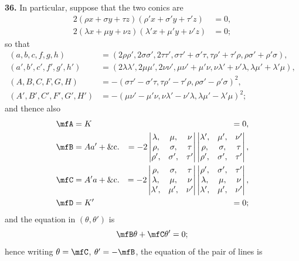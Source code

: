 \documentclass[11pt,a4paper]{book}
\begin{document}
\textbf{36.} In particular, suppose that the two conics are
\begin{align*}
2(\rho x + \sigma y + \tau z)(\rho' x + \sigma' y + \tau' z) &= 0,\\
2(\lambda x + \mu y + \nu z)(\lambda' x + \mu' y + \nu' z) &= 0;
\end{align*}
so that
\begin{align*}
(a, b, c, f, g, h) &= (2\rho\rho', 2\sigma\sigma', 2\tau\tau', \sigma\tau' + \sigma'\tau, \tau\rho' + \tau'\rho, \rho\sigma' + \rho'\sigma),\\
(a', b', c', f', g', h') &= (2\lambda\lambda', 2\mu\mu', 2\nu\nu', \mu\nu' + \mu'\nu, \nu\lambda' + \nu'\lambda, \lambda\mu' + \lambda'\mu),\\
(A, B, C, F, G, H) &= -(\sigma\tau' - \sigma'\tau, \tau\rho' - \tau'\rho, \rho\sigma' - \rho'\sigma)^{2},\\
(A', B', C', F', G', H') &= -(\mu\nu' - \mu'\nu, \nu\lambda' - \nu'\lambda, \lambda\mu' - \lambda'\mu)^{2};
\end{align*}
and thence also
\begin{align*}
\mfA &= K &= 0,\\
\mfB &= Aa' + \&\mathrm{c}. &= -2
\begin{vmatrix}
\lambda, & \mu, & \nu \\
\rho, & \sigma, & \tau \\
\rho', & \sigma', & \tau'
\end{vmatrix}
\begin{vmatrix}
\lambda', & \mu', & \nu' \\
\rho, & \sigma, & \tau \\
\rho', & \sigma', & \tau'
\end{vmatrix},\\
\mfC &= A'a + \&\mathrm{c}. &= -2
\begin{vmatrix}
\rho, & \sigma, & \tau \\
\lambda, & \mu, & \nu \\
\lambda', & \mu', & \nu'
\end{vmatrix}
\begin{vmatrix}
\rho', & \sigma', & \tau' \\
\lambda, & \mu, & \nu \\
\lambda', & \mu', & \nu'
\end{vmatrix},\\
\mfD &= K' &= 0;
\end{align*}
and the equation in $(\theta, \theta')$ is
\[
\mfB\theta + \mfC\theta' = 0;
\]
hence writing $\theta = \mfC$, $\theta' = -\mfB$, the equation of the pair of lines is
\end{document}

